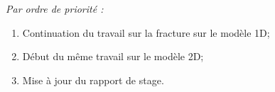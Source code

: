 \documentclass[
  french,
	11pt, %
]{fphw}
\begin{document}
\emph{Par ordre de priorité :}

\begin{enumerate}
  \item Continuation du travail sur la fracture sur le modèle 1D;
  \item Début du même travail sur le modèle 2D;
  \item Mise à jour du rapport de stage.
\end{enumerate}



\clearpage   %
\printbibliography
\end{document}
